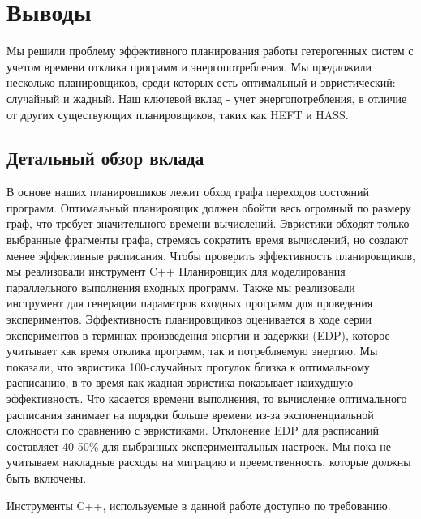 \chapter{Выводы}
\label{chap:conclusion}

Мы решили проблему эффективного планирования работы гетерогенных систем с учетом времени отклика программ и энергопотребления. Мы предложили несколько планировщиков, среди которых есть оптимальный и эвристический: случайный и жадный. Наш ключевой вклад - учет энергопотребления, в отличие от других существующих планировщиков, таких как HEFT и HASS.


\section{Детальный обзор вклада}
В основе наших планировщиков лежит обход графа переходов состояний программ. Оптимальный планировщик должен обойти весь огромный по размеру граф, что требует значительного времени вычислений. Эвристики обходят только выбранные фрагменты графа, стремясь сократить время вычислений, но создают менее эффективные расписания. Чтобы проверить эффективность планировщиков, мы реализовали инструмент C++ Планировщик для моделирования параллельного выполнения входных программ. Также мы реализовали инструмент для генерации параметров входных программ для проведения экспериментов. Эффективность планировщиков оценивается в ходе серии экспериментов в терминах произведения энергии и задержки (EDP), которое учитывает как время отклика программ, так и потребляемую энергию. Мы показали, что эвристика 100-случайных прогулок близка к оптимальному расписанию, в то время как жадная эвристика показывает наихудшую эффективность. Что касается времени выполнения, то вычисление оптимального расписания занимает на порядки больше времени из-за экспоненциальной сложности по сравнению с эвристиками. Отклонение EDP для расписаний составляет 40-50\% для выбранных экспериментальных настроек. Мы пока не учитываем накладные расходы на миграцию и преемственность, которые должны быть включены.

Инструменты C++, используемые в данной работе доступно по требованию.